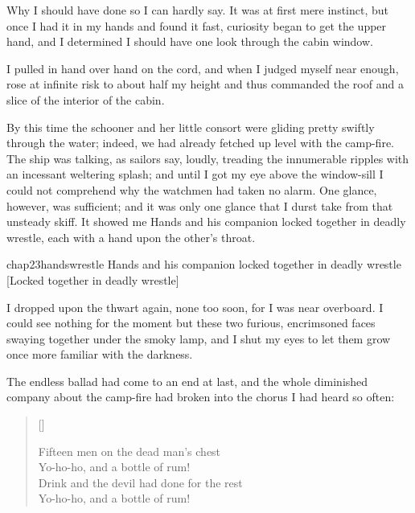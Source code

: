 Why I should have done so I can hardly say. It was at first mere instinct, but once I had it in my hands and found it fast, curiosity began to get the upper hand, and I determined I should have one look through the cabin window.

I pulled in hand over hand on the cord, and when I judged myself near enough, rose at infinite risk to about half my height and thus commanded the roof and a slice of the interior of the cabin.

By this time the schooner and her little consort were gliding pretty swiftly through the water; indeed, we had already fetched up level with the camp-fire. The ship was talking, as sailors say, loudly, treading the innumerable ripples with an incessant weltering splash; and until I got my eye above the window-sill I could not comprehend why the watchmen had taken no alarm. One glance, however, was sufficient; and it was only one glance that I durst take from that unsteady skiff. It showed me Hands and his companion locked together in deadly wrestle, each with a hand upon the other's throat.


\begin{bwbigpic}
	[\picsize]
	{chap23handswrestle}
	{Hands and his companion locked together in deadly wrestle}
	[Locked together in deadly wrestle]
\end{bwbigpic}

I dropped upon the thwart again, none too soon, for I was near overboard. I could see nothing for the moment but these two furious, encrimsoned faces swaying together under the smoky lamp, and I shut my eyes to let them grow once more familiar with the darkness.

The endless ballad had come to an end at last, and the whole diminished company about the camp-fire had broken into the chorus I had heard so often:

\settowidth{\versewidth}{Drink and the devil had done for the rest\longdash}
\begin{verse}[\versewidth]
\begin{altverse}
Fifteen men on the dead man’s chest\longdash\\
Yo-ho-ho, and a bottle of rum!\\
Drink and the devil had done for the rest\longdash\\
Yo-ho-ho, and a bottle of rum!
\end{altverse}
\end{verse}

